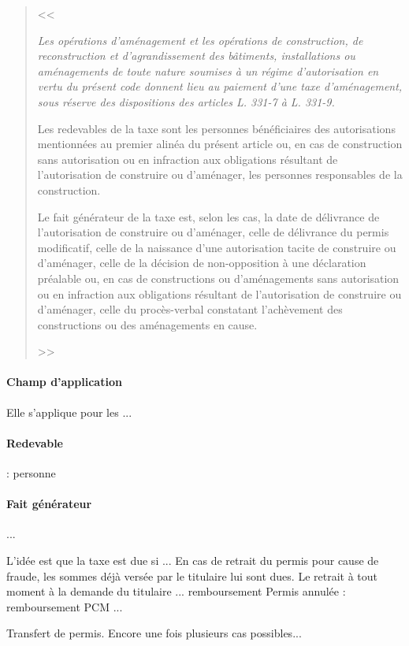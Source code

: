 	\begin{quote}
		
		<< {\itshape Les opérations d'aménagement et les opérations de construction, de reconstruction et d'agrandissement des bâtiments, installations ou aménagements de toute nature soumises à un régime d'autorisation en vertu du présent code donnent lieu au paiement d'une taxe d'aménagement, sous réserve des dispositions des articles L. 331-7 à L. 331-9.
			
		Les redevables de la taxe sont les personnes bénéficiaires des autorisations mentionnées au premier alinéa du présent article ou, en cas de construction sans autorisation ou en infraction aux obligations résultant de l'autorisation de construire ou d'aménager, les personnes responsables de la construction.
		
		Le fait générateur de la taxe est, selon les cas, la date de délivrance de l'autorisation de construire ou d'aménager, celle de délivrance du permis modificatif, celle de la naissance d'une autorisation tacite de construire ou d'aménager, celle de la décision de non-opposition à une déclaration préalable ou, en cas de constructions ou d'aménagements sans autorisation ou en infraction aux obligations résultant de l'autorisation de construire ou d'aménager, celle du procès-verbal constatant l'achèvement des constructions ou des aménagements en cause.} >>
	\end{quote}

	\paragraph{Champ d'application} Elle s'applique pour les ...
	
	\paragraph{Redevable} : personne 
	
	\paragraph{Fait générateur} ... 
	
	L'idée est que la taxe est due si ... En cas de retrait du permis pour cause de fraude, les sommes déjà versée par le titulaire lui sont dues.
	Le retrait à tout moment à la demande du titulaire ... remboursement 
	Permis annulée : remboursement
	PCM ...
	
	Transfert de permis. Encore une fois plusieurs cas possibles...
	
